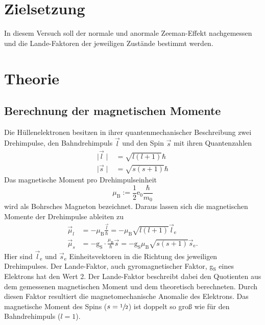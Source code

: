 \section{Zielsetzung}
\label{sec:Zielsetzung}
In diesem Versuch soll der normale und anormale Zeeman-Effekt nachgemessen und
die Lande-Faktoren der jeweiligen Zustände bestimmt werden.

\section{Theorie}
\label{sec:Theorie}
\subsection{Berechnung der magnetischen Momente}
\label{sec:Berechnung_magnetischer_Momente}
Die Hüllenelektronen besitzen in ihrer quantenmechanischer Beschreibung zwei
Drehimpulse, den Bahndrehimpuls $\vec{l}$ und den
Spin $\vec{s}$ mit ihren Quantenzahlen
\begin{align}
  \mid\vec{l}\mid &= \sqrt{l\left(l+1\right)}\hbar \\
  \mid\vec{s}\mid &= \sqrt{s\left(s+1\right)}\hbar
  \label{eqn:Quantenzahlen}
\end{align}
Das magnetische Moment pro Drehimpulseinheit \hbar
\begin{equation}
  \mu_\text{B} := \frac{1}{2}\text{e}_0 \frac{\hbar}{m_0}
  \label{eqn:bohr}
\end{equation}
wird als Bohrsches Magneton bezeichnet. Daraus lassen sich die magnetischen
Momente der Drehimpulse ableiten zu
\begin{align}
  \vec{\mu}_l &= -\mu_\text{B} \frac{\vec{l}}{\hbar} = -\mu_\text{B} \sqrt{l\left(l+1 \right)} \vec{l}_\text{e}\\
  \vec{\mu}_s &= -\text{g}_\text{S} \cdot \frac{\mu_\text{B}}{\hbar} \vec{s} = -\text{g}_\text{S} \mu_\text{B}\sqrt{s\left(s+1 \right)} \vec{s}_\text{e}.
  \label{eqn:momente}
\end{align}
Hier sind $\vec{l}_\text{e}$ und $\vec{s}_\text{e}$ Einheitsvektoren in die Richtung
des jeweiligen Drehimpulses.
Der Lande-Faktor, auch gyromagnetischer Faktor, g$_\text{S}$ eines Elektrons hat
den Wert 2. Der Lande-Faktor beschreibt dabei den Quotienten aus dem gemessenen
magnetischen Moment und dem theoretisch berechneten. Durch diesen Faktor
resultiert die magnetomechanische Anomalie des Elektrons. Das
magnetische Moment des Spins ($s = \sfrac{\num{1}}{\num{2}}$) ist doppelt so groß
wie für den Bahndrehimpuls ($l = \num{1}$).

